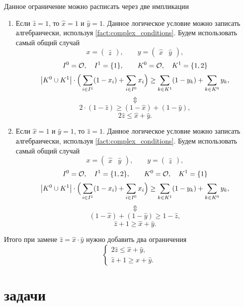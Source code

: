 Данное ограничение можно расписать через две импликации
\begin{enumerate}
	\item Если $\hat{z} = 1$, то $\hat{x} = 1$ и $\hat{y} = 1$. Данное логическое условие можно записать алгебраически, используя \cref{fact:complex_conditions}. Будем использовать самый общий случай
	\[
	x = \begin{pmatrix}\hat{z}\end{pmatrix}, \qquad y = \begin{pmatrix} \hat{x} & \hat{y} \end{pmatrix},
	\]
	\[
	I^0 = \mathcal{O}, \quad I^1 = \{1\}, \qquad K^0 = \mathcal{O}, \quad K^1 = \{1, 2\}
	\]
	\[
	\abs{K^0 \cup K^1} \cdot \Big(\sum_{i \in I^1}(1-x_i) + \sum_{i \in I^0}x_i\Big) \ge \sum_{k \in K^1}(1-y_k) + \sum_{k \in K^0}y_k,
	\]	
	\[\Updownarrow\]	
	\[
	2 \cdot (1 - \hat{z}) \ge (1 - \hat{x}) + (1 - \hat{y}),
	\]
	\[
	2\hat{z} \le \hat{x} + \hat{y}.
	\]
	
	\item Если $\hat{x} = 1$ и $\hat{y} = 1$, то $\hat{z} = 1$. Данное логическое условие можно записать алгебраически, используя \cref{fact:complex_conditions}. Будем использовать самый общий случай
	\[
	x = \begin{pmatrix}\hat{x} & \hat{y}\end{pmatrix}, \qquad y = \begin{pmatrix} \hat{z} \end{pmatrix},
	\]
	\[
	I^0 = \mathcal{O}, \quad I^1 = \{1, 2\}, \qquad K^0 = \mathcal{O}, \quad K^1 = \{1\}
	\]
	\[
	\abs{K^0 \cup K^1} \cdot \Big(\sum_{i \in I^1}(1-x_i) + \sum_{i \in I^0}x_i\Big) \ge \sum_{k \in K^1}(1-y_k) + \sum_{k \in K^0}y_k,
	\]
	\[\Updownarrow\]
	\[
	(1 - \hat{x}) + (1 - \hat{y}) \ge 1 - \hat{z},
	\]
	\[
	\hat{z} + 1 \ge \hat{x} + \hat{y}.
	\]
\end{enumerate}

Итого при замене $\hat{z} = \hat{x} \cdot \hat{y}$ нужно добавить два ограничения
\[
\boxed{\begin{cases}
		2\hat{z} \le \hat{x} + \hat{y}, \\
		\hat{z} + 1 \ge \hat{x} + \hat{y}.
\end{cases}}
\]

\section{задачи}



